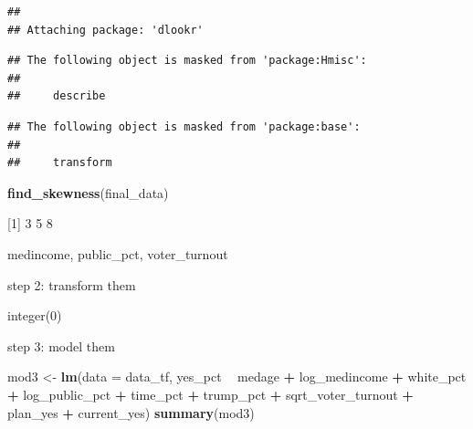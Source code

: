 \documentclass[
]{article}
\newenvironment{Shaded}{\begin{snugshade}}{\end{snugshade}}
\newcommand{\DataTypeTok}[1]{\textcolor[rgb]{0.13,0.29,0.53}{#1}}
\newcommand{\FloatTok}[1]{\textcolor[rgb]{0.00,0.00,0.81}{#1}}
\newcommand{\KeywordTok}[1]{\textcolor[rgb]{0.13,0.29,0.53}{\textbf{#1}}}
\newcommand{\NormalTok}[1]{#1}
\newcommand{\OperatorTok}[1]{\textcolor[rgb]{0.81,0.36,0.00}{\textbf{#1}}}
\newcommand{\StringTok}[1]{\textcolor[rgb]{0.31,0.60,0.02}{#1}}
\begin{document}
\begin{verbatim}
## 
## Attaching package: 'dlookr'
\end{verbatim}

\begin{verbatim}
## The following object is masked from 'package:Hmisc':
## 
##     describe
\end{verbatim}

\begin{verbatim}
## The following object is masked from 'package:base':
## 
##     transform
\end{verbatim}

\begin{Shaded}
\begin{Highlighting}[]
\KeywordTok{find_skewness}\NormalTok{(final_data)}
\end{Highlighting}
\end{Shaded}

{[}1{]} 3 5 8

medincome, public\_pct, voter\_turnout

step 2: transform them

\begin{Shaded}
\end{Shaded}

integer(0)

step 3: model them

\begin{Shaded}
\begin{Highlighting}[]
\NormalTok{mod3 <-}\StringTok{ }\KeywordTok{lm}\NormalTok{(}\DataTypeTok{data =}\NormalTok{ data_tf, yes_pct }\OperatorTok{~}\StringTok{ }\NormalTok{medage }\OperatorTok{+}\StringTok{ }\NormalTok{log_medincome }\OperatorTok{+}\StringTok{ }\NormalTok{white_pct }\OperatorTok{+}\StringTok{ }\NormalTok{log_public_pct }\OperatorTok{+}\StringTok{ }\NormalTok{time_pct }\OperatorTok{+}\StringTok{ }\NormalTok{trump_pct }\OperatorTok{+}\StringTok{ }\NormalTok{sqrt_voter_turnout }\OperatorTok{+}\StringTok{ }\NormalTok{plan_yes }\OperatorTok{+}\StringTok{ }\NormalTok{current_yes)}
\KeywordTok{summary}\NormalTok{(mod3)}
\end{Highlighting}
\end{Shaded}
\end{document}
